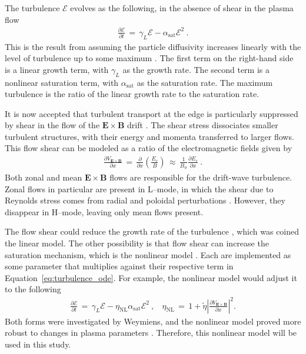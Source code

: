 The turbulence $\mathcal{E}$ evolves as the following, in the absence of shear in the plasma flow
\begin{align} %
	\frac{\partial\mathcal{E}}{\partial t} \,=\, \gamma_L\mathcal{E} - \alpha_\text{sat}\mathcal{E}^2~.
	\label{eq:turbulence_ode}
\end{align}
This is the result from assuming the particle diffusivity increases linearly with the level of turbulence up to some maximum \cite{diamond_dynamics_1995}.
The first term on the right-hand side is a linear growth term, with $\gamma_L$ as the growth rate.
The second term is a nonlinear saturation term, with $\alpha_\text{sat}$ as the saturation rate.
The maximum turbulence is the ratio of the linear growth rate to the saturation rate.

It is now accepted that turbulent transport at the edge is particularly suppressed by shear in the flow of the $\mathbf{E}\times\mathbf{B}$ drift \cite{terry_suppression_2000}.
The shear stress dissociates smaller turbulent structures, with their energy and momenta transferred to larger flows.
This flow shear can be modeled as a ratio of the electromagnetic fields given by \cite{staps_backstepping_2017}
\begin{align} %
	\frac{\partial V_{\mathbf{E}\times\mathbf{B}}}{\partial x} \,=\,
		\frac{\partial}{\partial x} \left(\frac{E_r}{B}\right) \,\approx\,
		\frac{1}{B_\phi} \frac{\partial E_r}{\partial x}~.
	\label{eq:velocity_shear}
\end{align}
Both zonal and mean $\mathbf{E}\times\mathbf{B}$ flows are responsible for the drift-wave turbulence.
Zonal flows in particular are present in L--mode, in which the shear due to Reynolds stress comes from radial and poloidal perturbations \cite{diamond_zonal_2005}.
However, they disappear in H--mode, leaving only mean flows present.

The flow shear could reduce the growth rate of the turbulence \cite{diamond_self-regulating_1994}, which was coined the linear model.
The other possibility is that flow shear can increase the saturation mechanism, which is the nonlinear model \cite{hahm_rotation_1994}.
Each are implemented as some parameter that multiplies against their respective term in Equation~\ref{eq:turbulence_ode}.
For example, the nonlinear model would adjust it to the following
\begin{align} %
	\frac{\partial\mathcal{E}}{\partial t} \,=\, \gamma_L\mathcal{E} -
		\eta_\text{NL}\alpha_\text{sat}\mathcal{E}^2~, ~~~~ \eta_\text{NL} \,=\,
		1 + \tilde{\eta} \left|\frac{\partial V_{\mathbf{E}\times\mathbf{B}}}{\partial x}\right|^2.
	\label{eq:nonlinear_turbulence_ode}
\end{align}
Both forms were investigated by Weymiens, and the nonlinear model proved more robust to changes in plasma parameters \cite{weymiens_bifurcation_2014}.
Therefore, this nonlinear model will be used in this study.

